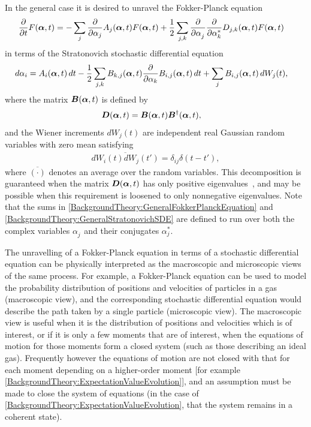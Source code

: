 In the general case it is desired to unravel the Fokker-Planck equation
\begin{align}
    \frac{\partial}{\partial t}F(\vect{\alpha}, t) &= - \sum_j \frac{\partial}{\partial \alpha_j} A_j(\vect{\alpha}, t) F(\vect{\alpha}, t) + \frac{1}{2} \sum_{j, k} \frac{\partial}{\partial \alpha_j^{\phantom{*}}} \frac{\partial}{\partial \alpha_k^*} D_{j,k}(\vect{\alpha}, t) F(\vect{\alpha}, t) \label{BackgroundTheory:GeneralFokkerPlanckEquation}
\end{align}
in terms of the Stratonovich stochastic differential equation \citep{GardinerHSM}
\begin{align}
    d \alpha_i &= A_i(\vect{\alpha}, t)\, dt  - \frac{1}{2} \sum_{j, k} B_{k, j}(\vect{\alpha}, t) \frac{\partial }{\partial \alpha_k}B_{i,j}(\vect{\alpha}, t) \, dt + \sum_j B_{i,j}(\vect{\alpha}, t) \,d W_j(t), \label{BackgroundTheory:GeneralStratonovichSDE}
\end{align}
where the matrix $\bm{B}(\bm{\alpha}, t)$ is defined by
\begin{align}
    \bm{D}(\bm{\alpha}, t) &= \bm{B}(\bm{\alpha}, t) \bm{B}^\dagger(\bm{\alpha}, t),
\end{align}
and the Wiener increments $d W_j(t)$ are independent real Gaussian random variables with zero mean satisfying
\begin{align}
    \overline{d W_i(t) dW_j(t')} = \delta_{i j}\delta(t - t'),
\end{align}
where $\overline{(\cdot)}$ denotes an average over the random variables.  This decomposition is guaranteed when the matrix $\bm{D}(\bm{\alpha}, t)$ has only positive eigenvalues~\citep{GardinerHSM}, and may be possible when this requirement is loosened to only nonnegative eigenvalues. Note that the sums in \eqref{BackgroundTheory:GeneralFokkerPlanckEquation} and \eqref{BackgroundTheory:GeneralStratonovichSDE} are defined to run over both the complex variables $\alpha_j^{\phantom{*}}$ and their conjugates $\alpha_j^*$.

The unravelling of a Fokker-Planck equation in terms of a stochastic differential equation can be physically interpreted as the macroscopic and microscopic views of the same process. For example, a Fokker-Planck equation can be used to model the probability distribution of positions and velocities of particles in a gas (macroscopic view), and the corresponding stochastic differential equation would describe the path taken by a single particle (microscopic view).  The macroscopic view is useful when it is the distribution of positions and velocities which is of interest, or if it is only a few moments that are of interest, when the equations of motion for those moments form a closed system (such as those describing an ideal gas). Frequently however the equations of motion are not closed with that for each moment depending on a higher-order moment [for example \eqref{BackgroundTheory:ExpectationValueEvolution}], and an assumption must be made to close the system of equations (in the case of \eqref{BackgroundTheory:ExpectationValueEvolution}, that the system remains in a coherent state). 

